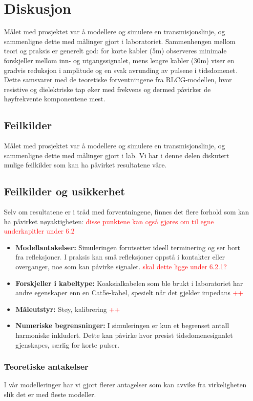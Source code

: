 \section{Diskusjon}
Målet med prosjektet var å modellere og simulere en transmisjonslinje, og sammenligne dette med målinger gjort i laboratoriet. Sammenhengen mellom teori og praksis er generelt god: for korte kabler (5m) observeres minimale forskjeller mellom inn- og utgangssignalet, mens lengre kabler (30m) viser en gradvis reduksjon i amplitude og en svak avrunding av pulsene i tidsdomenet. Dette samsvarer med de teoretiske forventningene fra RLCG-modellen, hvor resistive og dielektriske tap øker med frekvens og dermed påvirker de høyfrekvente komponentene mest.
\subsection{Feilkilder}
Målet med prosjektet var å modellere og simulere en transmisjonslinje, og sammenligne dette med målinger gjort i lab. Vi har i denne delen diskutert mulige feilkilder som kan ha påvirket resultatene våre.

\subsection{Feilkilder og usikkerhet}
Selv om resultatene er i tråd med forventningene, finnes det flere forhold som kan ha påvirket nøyaktigheten: \textcolor{red}{disse punktene kan også gjøres om til egne underkapitler under 6.2}
\begin{itemize}
\item \textbf{Modellantakelser:} Simuleringen forutsetter ideell terminering og ser bort fra refleksjoner. I praksis kan små refleksjoner oppstå i kontakter eller overganger, noe som kan påvirke signalet. \textcolor{red}{skal dette ligge under 6.2.1?}
\item \textbf{Forskjeller i kabeltype:} Koaksialkabelen som ble brukt i laboratoriet har andre egenskaper enn en Cat5e-kabel, spesielt når det gjelder impedans \textcolor{red}{++}
\item \textbf{Måleutstyr:} Støy, kalibrering \textcolor{red}{++}
\item \textbf{Numeriske begrensninger:} I simuleringen er kun et begrenset antall harmoniske inkludert. Dette kan påvirke hvor presist tidsdomenesignalet gjenskapes, særlig for korte pulser.
\end{itemize}

\subsubsection{Teoretiske antakelser}
I vår modelleringer har vi gjort flerer antagelser som kan avvike fra virkeligheten slik det er med fleste modeller. 
